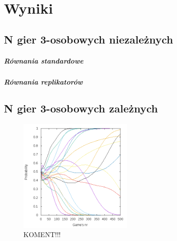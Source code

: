 \chapter{Wyniki}
\label{cha:wyniki}

\section{N gier 3-osobowych niezależnych}
\label{sec:N3nzal}

\paragraph{Równania standardowe}
\label{sec:r_stan}


\paragraph{Równania replikatorów}
\label{sec:r_repl}


\section{N gier 3-osobowych zależnych}
\label{sec:N3zal}
\begin{figure}
    \centering
    \label{pict:test}
    \includegraphics[width=0.5\textwidth]{pict/wyniki/g500p20}
    \caption{KOMENT!!!}
\end{figure}
\lipsum[1-5]